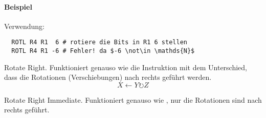 \paragraph{Beispiel}
Verwendung:
\begin{lstlisting}
  ROTL R4 R1  6 # rotiere die Bits in R1 6 stellen
  ROTL R4 R1 -6 # Fehler! da $-6 \not\in \mathds{N}$
\end{lstlisting}



\glqq Rotate Right\grqq.
Funktioniert genauso wie die Instruktion  mit dem Unterschied, dass
die Rotationen (Verschiebungen) nach rechts geführt werden.
\[
    X \gets Y \circlearrowright Z
\]


\glqq Rotate Right Immediate\grqq.
Funktioniert genauso wie , nur die Rotationen sind nach rechts
geführt.




